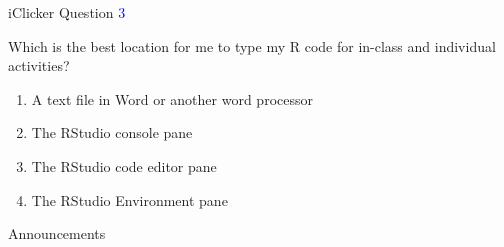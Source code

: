 \documentclass[ignorenonframetext,t]{beamer}
\begin{document}
\begin{frame}{iClicker Question \textcolor{blue}{3}}

Which is the best location for me to type my R code for in-class and
individual activities?

\begin{enumerate}[A]
\item A text file in Word or another word processor
\item The RStudio console pane
\item The RStudio code editor pane
\item The RStudio Environment pane
\end{enumerate}

\vfill


\end{frame}

\begin{frame}{Announcements}

\end{frame}
\end{document}
